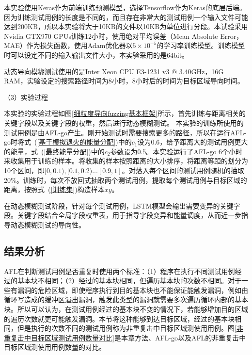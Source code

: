 本实验使用Keras作为前端训练预测模型，选择Tensorflow作为Keras的底层后端。因为训练测试用例的长度是不同的，而且存在非常大的测试用例一个输入文件可能达到200KB，所以本实验将大于10KB的文件以10KB为单位进行分段。本试验采用Nvidia GTX970 GPUs训练12小时，使用绝对平均误差（Mean Absolute Error，MAE）作为损失函数，使用Adam优化器以$5 \times 10^{-5}$的学习率训练模型。训练模型时可以设定不同的输入输出文件大小，本实验采用的是64bit。

动态导向模糊测试使用的是Inter Xeon CPU E3-1231 v3 @ 3.40GHz，16G RAM，实验设定的搜索路径时间为8小时，8小时后的时间为目标区域导向时间。

（3）实验过程

本实验的实验过程如图\ref{细粒度导向fuzzing基本框架}所示，首先训练与距离相关的关键字段以及关键字段的权重，然后进行动态模糊测试。
本实验的训练所使用的测试用例是由AFL-go产生。刚开始测试时需要搜索更多的路径，所以在运行AFL-go时将式~(\ref{基于模拟退火的能量分配})中的$c_1$设为0.6，给予距离大的测试用例更大的能量，式~(\ref{最终能量分配})中的$c_2$参数设为0.5。本实验运行了AFL-go 6个小时来收集用于训练的样本。将收集的样本按照距离的大小排序，将距离等距的划分为10个区间，即$[0,0.1),[0.1,0.2)...[0.9,1]$。对落入每个区间的测试用例随机的抽取20\%。训练时，每次不放回式抽取两个测试用例，提取每个测试用例与目标区域的距离，按照式~(\ref{训练集})构造样本$xy$。
%

在动态模糊测试阶段，针对每个测试用例，LSTM模型会输出需要变异的关键字段。关键字段结合全局字段权重表，用于指导字段变异和能量调度，从而近一步指导动态模糊测试的导向性。

\subsection{结果分析}

AFL在判断测试用例是否重复时使用两个标准：（1）程序在执行不同测试用例经过的基本块不相同；（2）经过的基本块相同，但遍历基本块的次数不相同。对于一些有漏洞的危险区域，即使程序执行到目的基本块也不能保证能触发漏洞，例如由循环写造成的缓冲区溢出漏洞，触发此类型的漏洞就需要多次遍历循环内部的基本块。所以可以认为，在测试用例经过的基本块不变的情况下，若能够增加目的区域的遍历次数就更可能触发漏洞。本节将这种能够到达目标区域，经过的基本块相同，但是执行的次数不同的测试用例称为非重复击中目标区域测使用用例。图\ref{非重复击中目标区域测试用例数量对比}是本章方法、AFL-go以及AFL的非重复击中目标区域测使用用例数量的对比。

